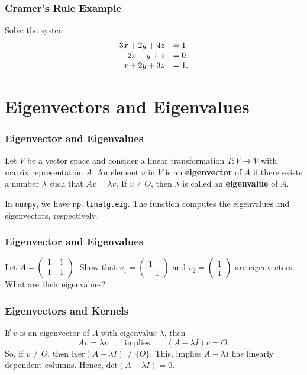 \documentclass{beamer}
\begin{document}
\begin{frame}[t]
\frametitle{Cramer's Rule Example}
\small
\begin{Example}
Solve the system 
$$
\begin{array}{r l}
3x + 2y + 4z 	&= 1\\
2x - y + z		&= 0\\
x + 2y + 3z	&= 1.
\end{array} 		
$$
\end{Example}


\end{frame}



\section{Eigenvectors and Eigenvalues}

\begin{frame}
\frametitle{Eigenvector and Eigenvalues}
\begin{Definition}
Let $V$ be a vector space and consider a linear transformation $T:V\to V$ with matrix representation $A$. An element $v$ in $V$ is an {\bf eigenvector} of $A$ if there exists a number $\lambda$ such that $Av = \lambda v$. If $v\neq O$, then $\lambda$ is called an {\bf eigenvalue} of $A$.
\end{Definition}
In \texttt{numpy}, we have \texttt{np.linalg.eig}. The function computes the eigenvalues and eigenvectors, respectively.
\end{frame}

\begin{frame}[t]
\frametitle{Eigenvector and Eigenvalues}
\begin{Example}
{\small
Let $A = \left(\begin{array}{c c} 1	&	1\\	1	&	1\end{array}\right)$. Show that $v_1 = \left(\begin{array}{c} 1\\	-1\end{array}\right)$ and $v_2 = \left(\begin{array}{c} 1\\ 1\end{array}\right)$ are eigenvectors. What are their eigenvalues?
}
\end{Example}

\end{frame}

\begin{frame}
\frametitle{Eigenvectors and Kernels}
If $v$ is an eigenvector of $A$ with eigenvalue $\lambda$, then
$$
Av = \lambda v\qquad\text{implies}\qquad (A - \lambda I)v = O.
$$
So, if $v\neq O$, then $\text{Ker}(A - \lambda I) \neq \{O\}$. This, implies $A - \lambda I$ has linearly dependent columns. Hence, $\text{det}(A - \lambda I) = 0$.

\end{frame}
\end{document}
